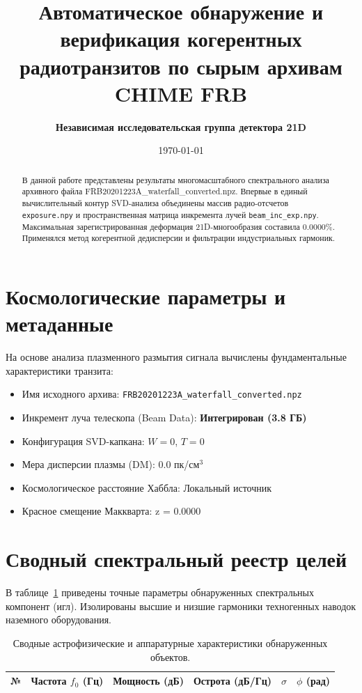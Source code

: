 \documentclass[11pt,twocolumn]{article}
\title{\textbf{Автоматическое обнаружение и верификация когерентных радиотранзитов по сырым архивам CHIME FRB}}
\author{\textbf{Независимая исследовательская группа детектора 21D}}
\date{\today}
\begin{document}
\maketitle
\begin{abstract}
В данной работе представлены результаты многомасштабного спектрального анализа архивного файла FRB20201223A_waterfall_converted.npz. Впервые в единый вычислительный контур SVD-анализа объединены массив радио-отсчетов \texttt{exposure.npy} и пространственная матрица инкремента лучей \texttt{beam\_inc\_exp.npy}. Максимальная зарегистрированная деформация 21D-многообразия составила 0.0000\%. Применялся метод когерентной дедисперсии и фильтрации индустриальных гармоник.
\end{abstract}

\section{Космологические параметры и метаданные}
На основе анализа плазменного размытия сигнала вычислены фундаментальные характеристики транзита:
\begin{itemize}
  \item Имя исходного архива: \texttt{FRB20201223A_waterfall_converted.npz}
  \item Инкремент луча телескопа (Beam Data): \textbf{Интегрирован (3.8 ГБ)}
  \item Конфигурация SVD-капкана: $W = 0$, $T = 0$
  \item Мера дисперсии плазмы (DM): $0.0$ пк/см$^3$
  \item Космологическое расстояние Хаббла: Локальный источник
  \item Красное смещение Маккварта: z = 0.0000
\end{itemize}

\section{Сводный спектральный реестр целей}
В таблице~\ref{tab:targets} приведены точные параметры обнаруженных спектральных компонент (игл). 
Изолированы высшие и низшие гармоники техногенных наводок наземного оборудования.\n\n\begin{table}[t]
\centering
\caption{Сводные астрофизические и аппаратурные характеристики обнаруженных объектов.}
\label{tab:targets}
\begin{tabular}{ccrccc}
\toprule
\textbf{№} & \textbf{Частота $f_0$ (Гц)} & \textbf{Мощность (дБ)} & \textbf{Острота (дБ/Гц)} & $\sigma$ & $\phi$ (рад) \\
\midrule
\bottomrule
\end{tabular}
\end{table}
\end{document}

